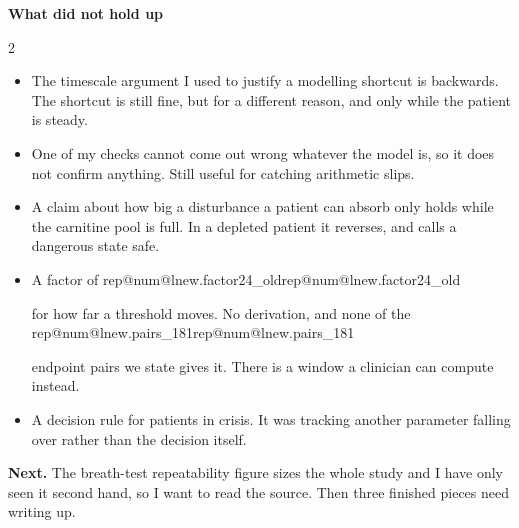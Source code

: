 \documentclass[10pt,a4paper]{article}
\makeatletter
\newcommand{\rn}[1]{%
  \ifcsname rep@num@#1\endcsname\csname rep@num@#1\endcsname
  \else\PackageError{update}{no generated number for this key}{}\fi}
\newcommand{\hd}[1]{\vspace{0.5pt}\textbf{#1}\par\vspace{-2.5pt}}
\makeatother
\begin{document}
\hd{What did not hold up}
\begin{multicols}{2}\raggedcolumns
\begin{itemize}
\item The timescale argument I used to justify a modelling shortcut is backwards. The shortcut
is still fine, but for a different reason, and only while the patient is steady.
\item One of my checks cannot come out wrong whatever the model is, so it does not confirm
anything. Still useful for catching arithmetic slips.
\item A claim about how big a disturbance a patient can absorb only holds while the carnitine
pool is full. In a depleted patient it reverses, and calls a dangerous state safe.
\item A factor of \rn{lnew.factor24_old} for how far a threshold moves. No derivation, and
none of the \rn{lnew.pairs_181} endpoint pairs we state gives it. There is a window a
clinician can compute instead.
\item A decision rule for patients in crisis. It was tracking another parameter falling over
rather than the decision itself.
\end{itemize}

\textbf{Next.} The breath-test repeatability figure sizes the whole study and I have only seen
it second hand, so I want to read the source. Then three finished pieces need writing up.
\end{multicols}
\end{document}
